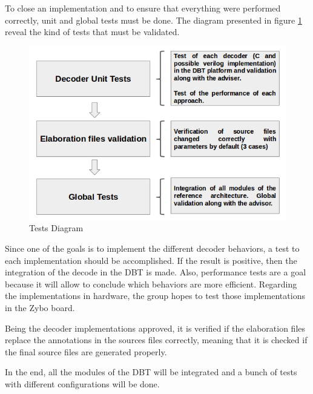 To close an implementation and to ensure that everything were performed correctly, unit and global tests must be done. The diagram presented in figure \ref{fig:tests} reveal the kind of tests that must be validated. 

\begin{figure}[H]
\centerline{
\includegraphics[scale=0.55]{images/tests}
}
\caption{Tests Diagram}
\label{fig:tests} 
\end{figure}

Since one of the goals is to implement the different decoder behaviors, a test to each implementation should be accomplished. If the result is positive, then the integration  of the decode in the DBT is made. Also, performance tests are a goal because it will allow to conclude which behaviors are more efficient. Regarding the implementations in hardware, the group hopes to test those implementations in the Zybo board.

Being the decoder implementations approved, it is verified if the elaboration files replace the annotations in the sources files correctly, meaning that it is checked if the final source files are generated properly.

In the end, all the modules of the DBT will be integrated and a bunch of tests with different configurations will be done.
